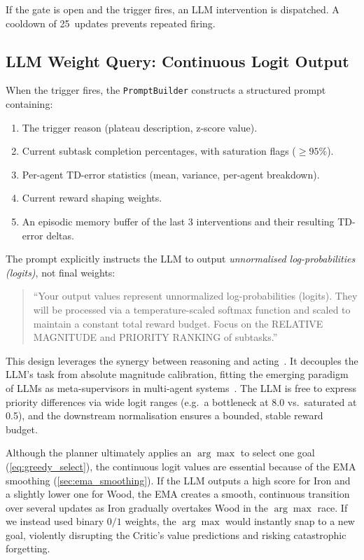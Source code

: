 If the gate is open and the trigger fires, an LLM intervention is dispatched.
A cooldown of 25~updates prevents repeated firing.

\subsection{LLM Weight Query: Continuous Logit Output}
\label{sec:llm_weight_query}

When the trigger fires, the \texttt{PromptBuilder} constructs a
structured prompt containing:

\begin{enumerate}[nosep]
    \item The trigger reason (plateau description, z-score value).
    \item Current subtask completion percentages, with saturation flags ($\ge 95\%$).
    \item Per-agent TD-error statistics (mean, variance, per-agent breakdown).
    \item Current reward shaping weights.
    \item An episodic memory buffer of the last 3 interventions and their
          resulting TD-error deltas.
\end{enumerate}

The prompt explicitly instructs the LLM to output \emph{unnormalised
log-probabilities (logits)}, not final weights:

\begin{quote}
\small\sffamily
``Your output values represent unnormalized log-probabilities (logits).
They will be processed via a temperature-scaled softmax function and
scaled to maintain a constant total reward budget.
Focus on the RELATIVE MAGNITUDE and PRIORITY RANKING of subtasks.''
\end{quote}

This design leverages the synergy between reasoning and acting~\parencite{Yao_Zhao_Yu_Du_Shafran_Narasimhan_Cao_2023}. It decouples the LLM's task from absolute magnitude calibration, fitting the emerging paradigm of LLMs as meta-supervisors in multi-agent systems~\parencite{Sun_Huang_Pompili_2024}.
The LLM is free to express priority differences via wide logit ranges
(e.g.\ a bottleneck at 8.0 vs.\ saturated at 0.5), and the downstream
normalisation ensures a bounded, stable reward budget.

Although the planner ultimately applies an $\arg\max$ to select one goal
(\cref{eq:greedy_select}), the continuous logit values are essential
because of the EMA smoothing (\cref{sec:ema_smoothing}).
If the LLM outputs a high score for Iron and a slightly lower one for
Wood, the EMA creates a smooth, continuous transition over several
updates as Iron gradually overtakes Wood in the $\arg\max$ race.
If we instead used binary $0/1$ weights, the $\arg\max$ would
instantly snap to a new goal, violently disrupting the Critic's value
predictions and risking catastrophic forgetting.

